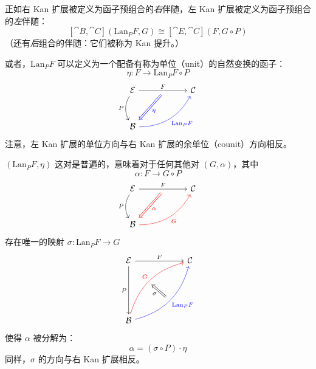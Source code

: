 \documentclass[DaoFP]{subfiles}
\begin{document}
正如右 Kan 扩展被定义为函子预组合的\emph{右}伴随，左 Kan 扩展被定义为函子预组合的\emph{左}伴随：
\[ [\cat B, \cat C](\text{Lan}_P F , G) \cong  [\cat E, \cat C] (F, G \circ P) \]
（还有\emph{后}组合的伴随：它们被称为 Kan 提升。）

或者，$\text{Lan}_P F$ 可以定义为一个配备有称为单位（unit）的自然变换的函子：
\[ \eta \colon F \to \text{Lan}_P F \circ P \]
\[
 \begin{tikzcd} [row sep=1cm, column sep=1cm]
 \cat E
 \arrow[rr, "F", "" {name=ID, below} ]
 \arrow[d, bend right, "P"']
 && \cat C
 \\
 \cat B
  \arrow[urr, blue, bend right, "\text{Lan}_P F"']
 \arrow[Rightarrow, blue, "\eta",  from=ID]
 \end{tikzcd}
\]
注意，左 Kan 扩展的单位方向与右 Kan 扩展的余单位（counit）方向相反。

$(\text{Lan}_P F, \eta)$ 这对是普遍的，意味着对于任何其他对 $(G, \alpha)$，其中
\[ \alpha \colon F \to G \circ P\] 
\[
 \begin{tikzcd} [row sep=1cm, column sep=1cm]
 \cat E
 \arrow[rr, "F", "" {name=ID, below} ]
 \arrow[d, bend right, "P"']
 && \cat C
 \\
 \cat B
  \arrow[urr, red, bend right, "G"']
 \arrow[Rightarrow, red, "\alpha",  from=ID]
 \end{tikzcd}
\]
存在唯一的映射 $\sigma \colon \text{Lan}_P F \to G$ 
\[
\begin{tikzcd}[row sep=2cm, column sep=2cm]
\cat E  \ar[d, "P"', "" {name=P}]
            \ar[r, "F", ""  {name=F, below, near start, bend right}]
&
\cat C
\\
\cat B
    \ar[ur, red, bend left, "G", "" {name=G, below}]
    \ar[ur, blue, bend right, "\text{Lan}_P F"', "" {name=Lan}]
\arrow[Rightarrow, "\sigma", from=Lan, to=G]
\end{tikzcd}
\]
使得 $\alpha$ 被分解为：
\[ \alpha = (\sigma \circ P) \cdot \eta \]
同样，$\sigma$ 的方向与右 Kan 扩展相反。
\end{document}
